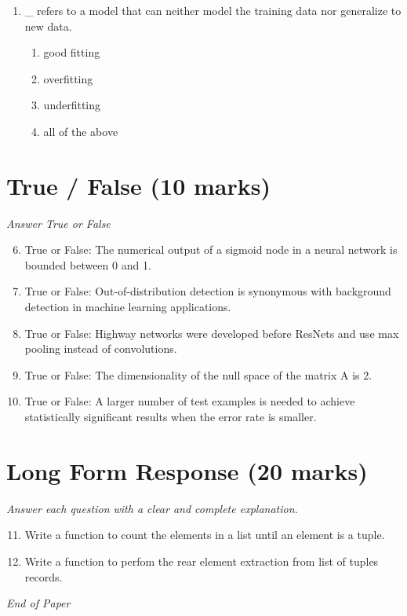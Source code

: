 \documentclass[12pt]{article}
\begin{document}
\begin{enumerate}[label=\arabic*.]
\begin{enumerate}[label=(\alph*)]
    \item Yann LeCun
    \item Stuart Russell
    \item Jitendra Malik
\end{enumerate}
\item \_ refers to a model that can neither model the training data nor generalize to new data.
\begin{enumerate}[label=(\alph*)]
    \item good fitting
    \item overfitting
    \item underfitting
    \item all of the above
\end{enumerate}
\end{enumerate}

\section*{True / False (10 marks)}
\textit{Answer True or False}
\begin{enumerate}[label=\arabic*.]
\setcounter{enumi}{5}
\item True or False: The numerical output of a sigmoid node in a neural network is bounded between 0 and 1.
\item True or False: Out-of-distribution detection is synonymous with background detection in machine learning applications.
\item True or False: Highway networks were developed before ResNets and use max pooling instead of convolutions.
\item True or False: The dimensionality of the null space of the matrix A is 2.
\item True or False: A larger number of test examples is needed to achieve statistically significant results when the error rate is smaller.
\end{enumerate}

\section*{Long Form Response (20 marks)}
\textit{Answer each question with a clear and complete explanation.}
\begin{enumerate}[label=\arabic*.]
\setcounter{enumi}{10}
\item Write a function to count the elements in a list until an element is a tuple.
\item Write a function to perfom the rear element extraction from list of tuples records.
\end{enumerate}

\vfill
\noindent\textit{End of Paper}
\end{document}
